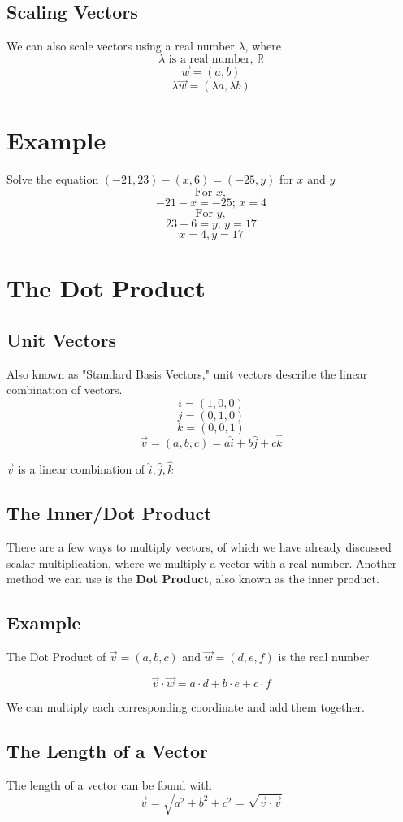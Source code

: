 \documentclass{article}
\begin{document}
\subsection{Scaling Vectors}
We can also scale vectors using a real number $\lambda$, where
\[\lambda \mbox{ is a real number, }\mathbb{R}\]
\[\vec{w} = (a,b)\]
\[\lambda\vec{w}=(\lambda a,\lambda b)\]

\section*{Example}
Solve the equation $(-21,23)-(x,6)=(-25,y)$ for $x$ and $y$
\[\mbox{For } x,\]
\[-21-x=-25\mbox{;  } x=4\]
\[\mbox{For } y,\]
\[23-6=y\mbox{;  } y=17\]
\[x=4,y=17\]

\section{The Dot Product}
\subsection{Unit Vectors}
Also known as "Standard Basis Vectors," unit vectors 
describe the linear combination of vectors.
\[i=(1,0,0)\]
\[j=(0,1,0)\]
\[k=(0,0,1)\]
\[\vec{v}=(a,b,c)=a\hat{i}+b\hat{j}+c\hat{k}\]

$\vec{v}$ is a linear combination of $\hat{i},\hat{j},\hat{k}$

\subsection{The Inner/Dot Product}
There are a few ways to multiply vectors, of which we have 
already discussed scalar multiplication, where we multiply 
a vector with a real number. Another method we can use is the 
\textbf{Dot Product}, also known as the inner product.

\subsection*{Example}
The Dot Product of $\vec{v}=(a,b,c)$ and $\vec{w}=(d,e,f)$ is the real number

\[ \vec{v}\cdot \vec{w}=a\cdot d +b\cdot e+ c\cdot f\]

We can multiply each corresponding coordinate and add them together.

\subsection{The Length of a Vector}
The length of a vector can be found with 
\[ \vec{v}=\sqrt{a^2 +b^2 +c^2}=\sqrt{\vec{v}\cdot \vec{v}}\]
\end{document}
